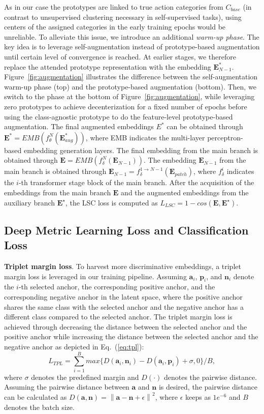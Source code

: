 \documentclass[lettersize,journal]{IEEEtran}
\newcommand{\mypar}[1]{\vspace{0.1cm}\noindent\textbf{#1}.}
\begin{document}
As in our case the prototypes are linked to true action categories from $C_{base}$ (in contrast to unsupervised clustering necessary in self-supervised tasks), using centers of the assigned categories in the early training epochs would be unreliable. To alleviate this issue, we introduce an additional \textit{warm-up phase}. The key idea is to leverage self-augmentation instead of prototype-based augmentation until certain level of convergence is reached. At earlier stages, we therefore replace the attended prototype representation with the embedding $\textbf{E}_{N-1}^*$. Figure~\ref{fig:augmentation} illustrates the difference between the self-augmentation warm-up phase (top) and the prototype-based augmentation (bottom). Then, we switch to the phase at the bottom of Figure~\ref{fig:augmentation}, while leveraging zero prototypes to achieve decenterization for a fixed number of epochs before using the class-agnostic prototype to do the feature-level prototype-based augmentation.
The final augmented embeddings $E^*$ can be obtained through $\textbf{E}^*=EMB({f_{\theta}^{ N}}(\textbf{E}_{aug}^*))$, where EMB indicates the multi-layer perceptron-based embedding generation layers. The final embedding from the main branch is obtained through $\textbf{E}=EMB(f_{\delta}^{ N}(\textbf{E}_{N-1}))$. The embedding $\textbf{E}_{N-1}$ from the main branch is obtained through  $\textbf{E}_{N-1} = f_{\delta}^{1 \to N-1}(\textbf{E}_{patch})$, where $f_{\delta}^{i}$ indicates the $i$-th transformer stage block of the main branch.
After the acquisition of the embeddings from the main branch $\mathbf{E}$ and the augmented embeddings from the auxiliary branch $\mathbf{E^{\star}}$, the LSC loss is computed as $L_{LSC}=1{-}cos(\mathbf{E},\mathbf{E^{\star}})$.

\subsection{Deep Metric Learning Loss and Classification Loss}
\mypar{Triplet margin loss} To harvest more discriminative embeddings, a triplet margin loss is leveraged in our training pipeline.
Assuming $\textbf{a}_i$, $\textbf{p}_i$, and $\textbf{n}_i$ denote the $i$-th selected anchor, the corresponding positive anchor, and the corresponding negative anchor in the latent space, where the positive anchor shares the same class with the selected anchor and the negative anchor has a different class compared to the selected anchor.
The triplet margin loss is achieved through decreasing the distance between the selected anchor and the positive anchor while increasing the distance between the selected anchor and the negative anchor as depicted in Eq.~(\ref{eq:tpl}):
\begin{equation}
\label{eq:tpl}
    L_{TPL} =\sum_{i=1}^{B} max\{D(\textbf{a}_i,\textbf{n}_i)-D(\textbf{a}_i,\textbf{p}_i) + \sigma, 0\}/B,
\end{equation}
where $\sigma$ denotes the predefined margin and $D(\cdot)$ denotes the pairwise distance. Assuming the pairwise distance between $\textbf{a}$ and $\textbf{n}$ is desired, the pairwise distance can be calculated as $D(\textbf{a},\textbf{n}) = 	\left \| \textbf{a}-\textbf{n} + \epsilon\right \|^2$, where $\epsilon$ keeps as $1e^{-6}$ and $B$ denotes the batch size.
\end{document}
